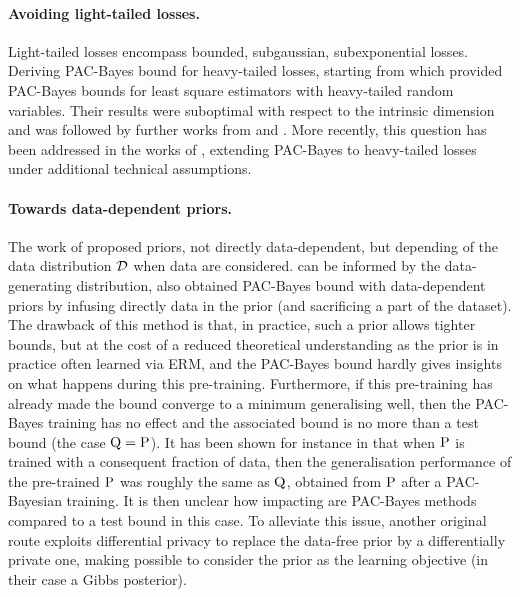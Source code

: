 \paragraph{Avoiding light-tailed losses.} Light-tailed losses encompass bounded, subgaussian, subexponential losses. Deriving PAC-Bayes bound for heavy-tailed losses, starting from \citet{audibert2011robust} which provided PAC-Bayes bounds for least square estimators with heavy-tailed random variables. Their results were suboptimal with respect to the intrinsic dimension and was followed by further works from \citet{catoni2016pac} and \citet{catoni2017dimension}.
More recently, this question has been addressed in the works of \citet{alquier2018simpler, holland2019pac,kuzborskij2019efron,haddouche2021pac}, extending PAC-Bayes to heavy-tailed losses under additional technical assumptions.

\paragraph{Towards data-dependent priors.} The work of \citep{catoni2007pac,lever2010distribution,lever2013tighter} proposed priors, not directly data-dependent, but depending of the data distribution $\Dcal$ when \iid data are considered. can be informed by the
data-generating distribution, \citet{parradohernandez2012pac,oneto2016pac,dziugaite2017computing,mhammedi2019pac} also obtained PAC-Bayes bound with data-dependent priors by infusing directly data in the prior (and sacrificing a part of the dataset). The drawback of this method is that, in practice, such a prior allows tighter bounds, but at the cost of a reduced theoretical understanding as the prior is in practice often learned via ERM, and the PAC-Bayes bound hardly gives insights on what happens during this pre-training. Furthermore, if this pre-training has already made the bound converge to a minimum generalising well, then the PAC-Bayes training has no effect and the associated bound is no more than a test bound (the case $\Q=\P$). It has been shown for instance in \citep{perezortiz2021learning} that when $\P$ is trained with a consequent fraction of data, then the generalisation performance of the pre-trained $\P$ was roughly the same as $\Q$, obtained from $\P$ after a PAC-Bayesian training. It is then unclear how impacting are PAC-Bayes methods compared to a test bound in this case. To alleviate this issue, another original route \citep{dziugaite2018data} exploits differential privacy to replace the data-free prior by a differentially private one, making possible to consider the prior as the learning objective (in their case a Gibbs posterior).

